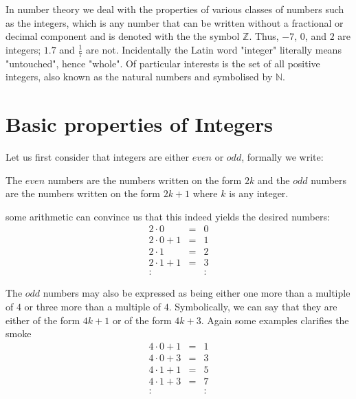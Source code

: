 

In number theory we deal with the properties of various classes of numbers such
as the integers, which is any number that can be written without a fractional
or decimal component and is denoted with the the symbol $\mathbb{Z}$. Thus,
$-7$, $0$, and $2$ are integers; $1.7$ and $\frac{1}{7}$ are not. Incidentally
the Latin word "integer" literally means "untouched", hence "whole". Of
particular interests is the set of all positive integers, also known as the
natural numbers and symbolised by $\mathbb{N}$.

\section{Basic properties of Integers}
Let us first consider that integers are either $even$ or $odd$, formally we
write:
\begin{definition}\label{num_def}
The $even$ numbers are the numbers written on the form $2k$ and the $odd$ numbers are the numbers written on the form $2k+1$ where $k$ is any integer.
\end{definition}
some arithmetic can convince us that this indeed yields the desired numbers:
\[
\begin{array}{lcl}
2 \cdot 0     & = & 0 \\
2 \cdot 0 + 1 & = & 1 \\
2 \cdot 1     & = & 2 \\
2 \cdot 1 + 1 & = & 3 \\
:             &   & :
\end{array}
\]

The $odd$ numbers may also be expressed as being either one more than a
multiple of $4$ or three more than a multiple of $4$. Symbolically, we can say
that they are either of the form $4k + 1$ or of the form $4k  + 3$. Again some
examples clarifies the smoke
\[
\begin{array}{lcl}
4 \cdot 0 + 1 & = & 1 \\
4 \cdot 0 + 3 & = & 3 \\
4 \cdot 1 + 1 & = & 5 \\
4 \cdot 1 + 3 & = & 7 \\
:             &   & :
\end{array}
\]

